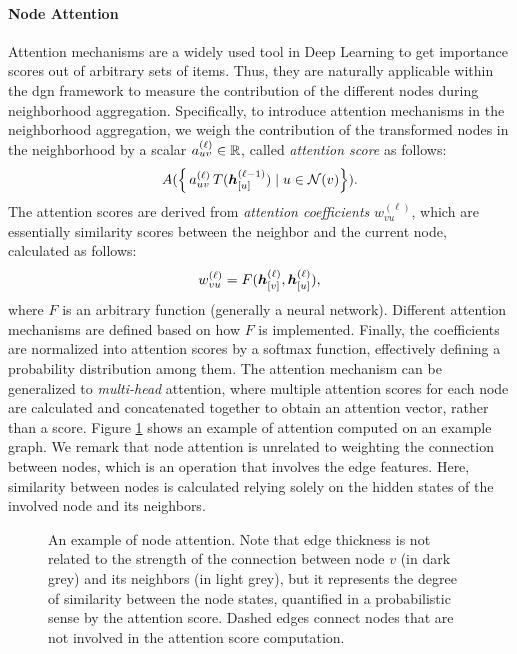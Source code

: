 \paragraph{Node Attention}
Attention mechanisms \citep{bahdanau2015attention} are a widely used tool in Deep Learning to get importance scores out of arbitrary sets of items. Thus, they are naturally applicable within the \gls{dgn} framework to measure the contribution of the different nodes during neighborhood aggregation. Specifically, to introduce attention mechanisms in the neighborhood aggregation, we weigh the contribution of the transformed nodes in the neighborhood by a scalar $a^{(\ell)}_{uv} \in \mathbb{R}$, called \emph{attention score} as follows:
$$A(\Set{\,a^{(\ell)}_{uv}\,T(\StateVector{u}{\ell-1}) \mid u \in \Neigh(v)}).$$
The attention scores are derived from \emph{attention coefficients} $w_{vu}^{(\ell)}$, which are essentially similarity scores between the neighbor and the current node, calculated as follows:
$$w_{vu}^{(\ell)} = F(\StateVector{v}{\ell}, \StateVector{u}{\ell}),$$
where $F$ is an arbitrary function (generally a neural network). Different attention mechanisms are defined based on how $F$ is implemented. Finally, the coefficients are normalized into attention scores by a softmax function, effectively defining a probability distribution among them. The attention mechanism can be generalized to \emph{multi-head} attention, where multiple attention scores for each node are calculated and concatenated together to obtain an attention vector, rather than a score. Figure \ref{fig:attention} shows an example of attention computed on an example graph. We remark that node attention is unrelated to weighting the connection between nodes, which is an operation that involves the edge features. Here, similarity between nodes is calculated relying solely on the hidden states of the involved node and its neighbors.

\begin{figure}[h!]
    \centering
    \resizebox{.35\textwidth}{!}{}
    \caption{An example of node attention. Note that edge thickness is not related to the strength of the connection between node $v$ (in dark grey) and its neighbors (in light grey), but it represents the degree of similarity between the node states, quantified in a probabilistic sense by the attention score. Dashed edges connect nodes that are not involved in the attention score computation.}
    \label{fig:attention}
\end{figure}

